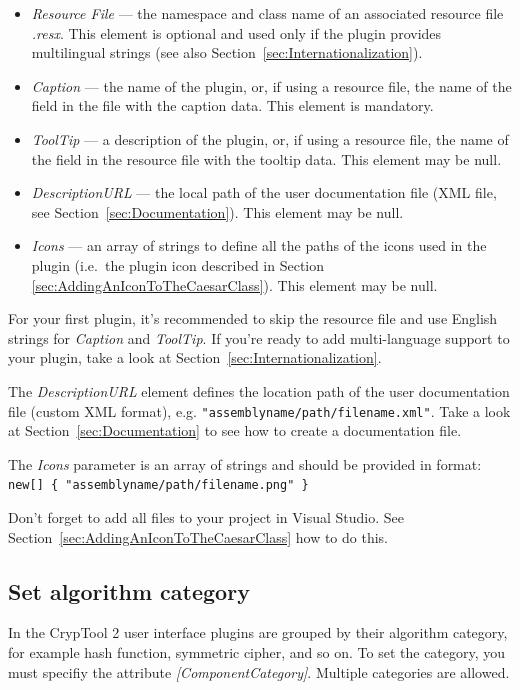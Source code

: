 \begin{itemize}
	\item \textit{Resource File} --- the namespace and class name of an associated resource file \textit{.resx}. This element is optional and used only if the plugin provides multilingual strings (see also Section~\ref{sec:Internationalization}).
	\item \textit{Caption} --- the name of the plugin, or, if using a resource file, the name of the field in the file with the caption data. This element is mandatory.
	\item \textit{ToolTip} --- a description of the plugin, or, if using a resource file, the name of the field in the resource file with the tooltip data. This element may be null.
	\item \textit{DescriptionURL} --- the local path of the user documentation file (XML file, see Section~\ref{sec:Documentation}). This element may be null.
	\item \textit{Icons} --- an array of strings to define all the paths of the icons used in the plugin (i.e.\ the plugin icon described in Section \ref{sec:AddingAnIconToTheCaesarClass}). This element may be null.
\end{itemize}

For your first plugin, it's recommended to skip the resource file and use English strings for \textit{Caption} and \textit{ToolTip}. If you're ready to add multi-language support to your plugin, take a look at Section~\ref{sec:Internationalization}.

The \textit{DescriptionURL} element defines the location path of the user documentation file (custom XML format), e.g. \texttt{"assemblyname/path/filename.xml"}. Take a look at Section~\ref{sec:Documentation} to see how to create a documentation file.

The \textit{Icons} parameter is an array of strings and should be provided in format: \\
\texttt{new[] \{ "assemblyname/path/filename.png" \} }

Don't forget to add all files to your project in Visual Studio. See Section~\ref{sec:AddingAnIconToTheCaesarClass} how to do this.

\subsection{Set algorithm category}
\label{sec:AlgorithmCategory}

In the CrypTool 2 user interface plugins are grouped by their algorithm category, for example hash function, symmetric cipher, and so on. To set the category, you must specifiy the attribute \textit{[ComponentCategory]}. Multiple categories are allowed.

